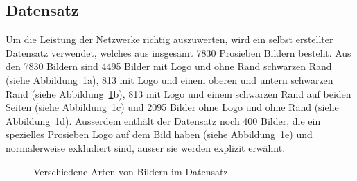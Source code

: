 \documentclass[12pt,a4paper]{report}
\begin{document}
\subsection{Datensatz}\label{subsec:datensatz}
Um die Leistung der Netzwerke richtig auszuwerten, wird ein selbst erstellter Datensatz verwendet,
welches aus insgesamt 7830 Prosieben Bildern besteht.
Aus den 7830 Bildern sind 4495 Bilder mit Logo und ohne Rand schwarzen Rand (siehe Abbildung~\ref{fig:all_logo}a),
813 mit Logo und einem oberen und untern schwarzen Rand (siehe Abbildung~\ref{fig:all_logo}b),
813 mit Logo und einem schwarzen Rand auf beiden Seiten (siehe Abbildung~\ref{fig:all_logo}c)
und 2095 Bilder ohne Logo und ohne Rand (siehe Abbildung~\ref{fig:all_logo}d).
Ausserdem enthält der Datensatz noch 400 Bilder, die ein spezielles Prosieben Logo auf dem Bild haben (siehe Abbildung~\ref{fig:all_logo}e)
und normalerweise exkludiert sind, ausser sie werden explizit erwähnt.
\begin{figure}[h]%
    \centering
    \qquad
    \qquad
    \qquad
    \qquad
    \caption{Verschiedene Arten von Bildern im Datensatz}%
    \label{fig:all_logo}%
\end{figure}
\end{document}
